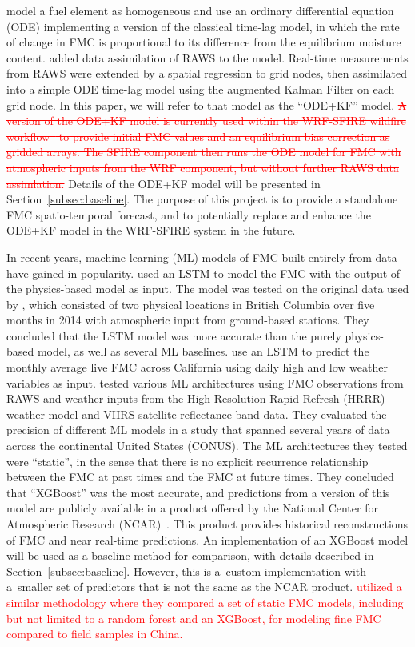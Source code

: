 \documentclass[fire,article,submit,pdftex,moreauthors]{Definitions/mdpi}
\begin{document}
\citet{Mandel-2014-RAA} model a fuel element as homogeneous and use an ordinary differential equation (ODE) implementing a version of the classical time-lag model, in which the rate of change in FMC is proportional to its difference from the equilibrium moisture content. \citet{Vejmelka-2014-DAF} added data assimilation of RAWS to the model. Real-time measurements from RAWS were extended by a spatial regression to grid nodes, then assimilated into a simple ODE time-lag model using the augmented Kalman Filter on each grid node. In this paper, we will refer to that model as the ``ODE+KF'' model. \textcolor{red}{\sout{A version of the ODE+KF model is currently used within the WRF-SFIRE wildfire workflow~\citep{Mandel-2019-IDH} to provide initial FMC values and an equilibrium bias correction as gridded arrays. The SFIRE component then runs the ODE model for FMC with atmospheric inputs from the WRF component, but without further RAWS data assimlation.}} Details of the ODE+KF model will be presented in Section~\ref{subsec:baseline}. The purpose of this project is to provide a standalone FMC spatio-temporal forecast, and to potentially replace and enhance the ODE+KF model in the WRF-SFIRE system in the future.

In recent years, machine learning (ML) models of FMC built entirely from data have gained in popularity. \citet{Fan-2021-PGD} used an LSTM to model the FMC with the output of the \citet{vanderKamp-2017-MFS} physics-based model as input. The model was tested on the original data used by \citet{vanderKamp-2017-MFS}, which consisted of two physical locations in British Columbia over five months in 2014 with atmospheric input from ground-based stations. They concluded that the LSTM model was more accurate than the purely physics-based model, as well as several ML baselines. \citet{Kang-2022-FMC} use an LSTM to predict the monthly average live FMC across California using daily high and low weather variables as input. \citet{Schreck-2023-MLV} tested various ML architectures using FMC observations from RAWS and weather inputs from the High-Resolution Rapid Refresh (HRRR) weather model and VIIRS satellite reflectance band data. They evaluated the precision of different ML models in a study that spanned several years of data across the continental United States (CONUS). The ML architectures they tested were ``static'', in the sense that there is no explicit recurrence relationship between the FMC at past times and the FMC at future times. They concluded that ``XGBoost'' was the most accurate, and predictions from a version of this model are publicly available in a product offered by the National Center for Atmospheric Research (NCAR)~\citep{NCAR-2025-FMC}. This product provides historical reconstructions of FMC and near real-time predictions. An implementation of an XGBoost model will be used as a baseline method for comparison, with details described in Section~\ref{subsec:baseline}. However, this is a~custom implementation with a~smaller set of predictors that is not the same as the NCAR product. \textcolor{red}{\citet{Hou-2024-CAM} utilized a similar methodology where they compared a set of static FMC models, including but not limited to a random forest and an XGBoost, for modeling fine FMC compared to field samples in China.}
\end{document}
